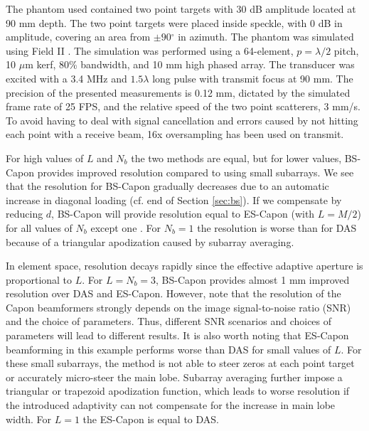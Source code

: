 \documentclass[journal]{IEEEtran}
\newcommand{\degree}{\ensuremath{^\circ}}
\begin{document}
The phantom used contained two point targets with 30 dB amplitude located at 90 mm depth. The two point targets were placed inside speckle, with 0 dB in amplitude, covering an area from $\pm90\degree$ in azimuth. The phantom was simulated using Field II \cite{Jensen1992, Jensen1996}. The simulation was performed using a 64-element, $p=\lambda/2$ pitch, 10 $\mu$m kerf, 80\% bandwidth, and 10 mm high phased array. The transducer was excited with a 3.4 MHz and $1.5\lambda$ long pulse with transmit focus at 90 mm. The precision of the presented measurements is 0.12 mm, dictated by the simulated frame rate of 25 FPS, and the relative speed of the two point scatterers, 3 mm/s. To avoid having to deal with signal cancellation and errors caused by not hitting each point with a receive beam, 16x oversampling has been used on transmit. 

For high values of $L$ and $N_b$ the two methods are equal, but for lower values, BS-Capon provides improved resolution compared to using small subarrays. We see that the resolution for BS-Capon gradually decreases due to an automatic increase in diagonal loading (cf. end of Section \ref{sec:bs}). If we compensate by reducing $d$, BS-Capon will provide resolution equal to ES-Capon (with $L=M/2$) for all values of $N_b$ except one \cite{Nilsen2009}. For $N_b=1$ the resolution is worse than for DAS because of a triangular apodization caused by subarray averaging. 

In element space, resolution decays rapidly since the effective adaptive aperture is proportional to $L$. For $L = N_b=3$, BS-Capon provides almost 1 mm improved resolution over DAS and ES-Capon. However, note that the resolution of the Capon beamformers strongly depends on the image signal-to-noise ratio (SNR) and the choice of parameters. Thus, different SNR scenarios and choices of parameters will lead to different results. It is also worth noting that ES-Capon beamforming in this example performs worse than DAS for small values of $L$. For these small subarrays, the method is not able to steer zeros at each point target or accurately micro-steer the main lobe. Subarray averaging further impose a triangular or trapezoid apodization function, which leads to worse resolution if the introduced adaptivity can not compensate for the increase in main lobe width. For $L=1$ the ES-Capon is equal to DAS.
\end{document}
